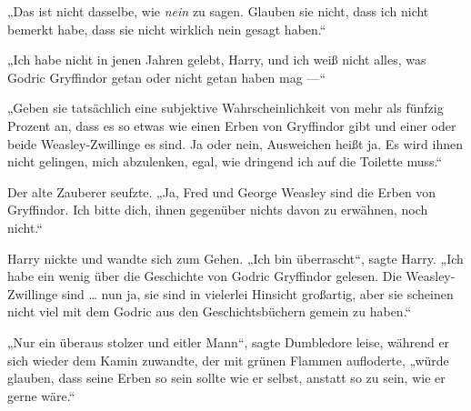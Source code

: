 „Das ist nicht dasselbe, wie \emph{nein} zu sagen. Glauben sie nicht, dass ich nicht bemerkt habe, dass sie nicht wirklich nein gesagt haben.“

„Ich habe nicht in jenen Jahren gelebt, Harry, und ich weiß nicht alles, was Godric Gryffindor getan oder nicht getan haben mag —“

„Geben sie tatsächlich eine subjektive Wahrscheinlichkeit von mehr als fünfzig Prozent an, dass es so etwas wie einen Erben von Gryffindor gibt und einer oder beide Weasley-Zwillinge es sind. Ja oder nein, Ausweichen heißt ja. Es wird ihnen nicht gelingen, mich abzulenken, egal, wie dringend ich auf die Toilette muss.“

Der alte Zauberer seufzte.
„Ja, Fred und George Weasley sind die Erben von Gryffindor. Ich bitte dich, ihnen gegenüber nichts davon zu erwähnen, noch nicht.“

Harry nickte und wandte sich zum Gehen.
„Ich bin überrascht“, sagte Harry.
„Ich habe ein wenig über die Geschichte von Godric Gryffindor gelesen. Die Weasley-Zwillinge sind … nun ja, sie sind in vielerlei Hinsicht großartig, aber sie scheinen nicht viel mit dem Godric aus den Geschichtsbüchern gemein zu haben.“

„Nur ein überaus stolzer und eitler Mann“, sagte Dumbledore leise, während er sich wieder dem Kamin zuwandte, der mit grünen Flammen aufloderte, „würde glauben, dass seine Erben so sein sollte wie er selbst, anstatt so zu sein, wie er gerne wäre.“

